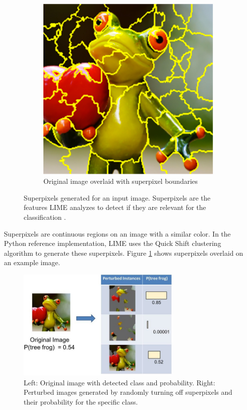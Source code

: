 \begin{figure}[H]
\begin{subfigure}[t]{.35\textwidth}
        \includegraphics[width=\linewidth]{chapters/02_methods/images/frog2.png}
        \caption{Original image overlaid with superpixel boundaries}
    \end{subfigure}
    \caption{Superpixels generated for an input image. Superpixels are the features LIME analyzes to detect if they are relevant for the classification \cite{limeoreilly}.}
    \label{lime_superpixel}
\end{figure}


Superpixels are continuous regions on an image with a similar color. In the Python reference implementation, LIME uses the Quick Shift \cite{vedaldi2008quick} clustering algorithm to generate these superpixels. Figure \ref{lime_superpixel} shows superpixels overlaid on an example image.

\begin{figure}[H]
\centering
\includegraphics[width=8cm]{chapters/02_methods/images/lime1.jpg}
\caption{Left: Original image with detected class and probability. Right: Perturbed images generated by randomly turning off superpixels and their probability for the specific class.}
\label{lime_perturbed}
\end{figure}

